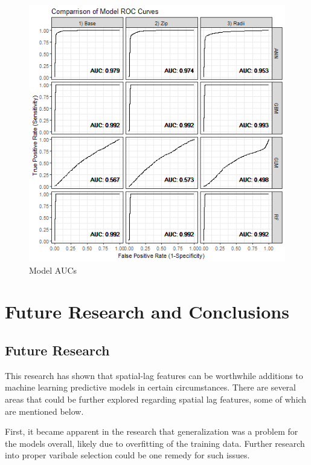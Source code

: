 \documentclass[12pt,]{article}
\begin{document}
\begin{figure}[H]
\includegraphics[width=1\linewidth]{Sections/tables and figures/compare_model_roc_curves} \caption{Model AUCs}\label{fig:Model AUC Comparrison}
\end{figure}

\hypertarget{future-research-and-conclusions}{%
\section{Future Research and
Conclusions}\label{future-research-and-conclusions}}

\hypertarget{future-research}{%
\subsection{Future Research}\label{future-research}}

This research has shown that spatial-lag features can be worthwhile
additions to machine learning predictive models in certain
circumstances. There are several areas that could be further explored
regarding spatial lag features, some of which are mentioned below.

First, it became apparent in the research that generalization was a
problem for the models overall, likely due to overfitting of the
training data. Further research into proper varibale selection could be
one remedy for such issues.
\end{document}
